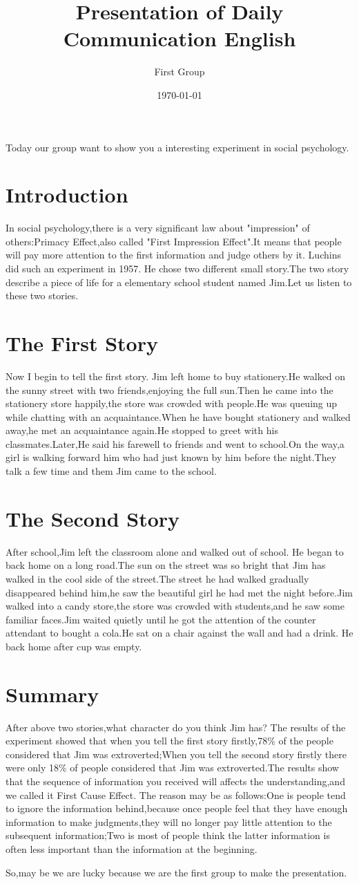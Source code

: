 \documentclass[UTF8]{article}
\title{Presentation of Daily Communication English}
\author{First Group}
\date{\today}
\begin{document}
	\maketitle
	Today our group want to show you a interesting experiment in social psychology.
	\section{Introduction}	
	In social psychology,there is a very significant law about "impression" of others:Primacy Effect,also called "First Impression Effect".It means that people will pay more attention to the first information and judge others by it.
	Luchins did such an experiment in 1957. He chose two different small story.The two story describe a piece of life for a elementary school student named Jim.Let us listen to these two stories.
	\section{The First Story}
	Now I begin to tell the first story.
	Jim left home to buy stationery.He walked on the sunny street with two friends,enjoying the full sun.Then he came into the stationery store happily,the store was crowded with people.He was queuing up while chatting with an acquaintance.When he have bought stationery and walked away,he met an acquaintance again.He stopped to greet with his classmates.Later,He said his farewell to friends and went to school.On the way,a girl is walking forward him who had just known by him before the night.They talk a few time and them Jim came to the school.
	\section{The Second Story}
	After school,Jim left the classroom alone and walked out of school. He began to back home on a long road.The sun on the street was so bright that Jim has walked in the cool side of the street.The street he had walked gradually disappeared behind him,he saw the beautiful girl he had met the night before.Jim walked into a candy store,the store was crowded with students,and he saw some familiar faces.Jim waited quietly until he got the attention of the counter attendant to bought a cola.He sat on a chair against the wall and had a drink. He back home after cup was empty.
	\section{Summary}
	After above two stories,what character do you think Jim has?
	The results of the experiment showed that when you tell the first story firstly,78\% of the people considered that Jim was extroverted;When you tell the second story firstly there were only 18\% of people considered that Jim was extroverted.The results show that the sequence of information you received will affects the understanding,and we called it First Cause Effect.
	The reason may be as follows:One is people tend to ignore the information behind,because once people feel that they have enough information to make judgments,they will no longer pay little attention to the subsequent information;Two is most of people think the latter information is often less important than the information at the beginning.
	
	\sun So,may be we are lucky because we are the first group to make the presentation.
\end{document}
